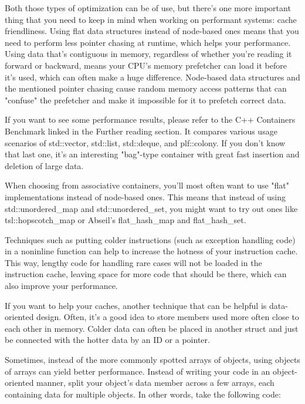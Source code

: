 
Both those types of optimization can be of use, but there's one more important thing that you need to keep in mind when working on performant systems: cache friendliness. Using flat data structures instead of node-based ones means that you need to perform less pointer chasing at runtime, which helps your performance. Using data that's contiguous in memory, regardless of whether you're reading it forward or backward, means your CPU's memory prefetcher can load it before it's used, which can often make a huge difference. Node-based data structures and the mentioned pointer chasing cause random memory access patterns that can "confuse" the prefetcher and make it impossible for it to prefetch correct data.

If you want to see some performance results, please refer to the C++ Containers Benchmark linked in the Further reading section. It compares various usage scenarios of std::vector, std::list, std::deque, and plf::colony. If you don't know that last one, it's an interesting "bag"-type container with great fast insertion and deletion of large data.

When choosing from associative containers, you'll most often want to use "flat" implementations instead of node-based ones. This means that instead of using std::unordered\_map and std::unordered\_set, you might want to try out ones like tsl::hopscotch\_map or Abseil's flat\_hash\_map and flat\_hash\_set.

Techniques such as putting colder instructions (such as exception handling code) in a noninline function can help to increase the hotness of your instruction cache. This way, lengthy code for handling rare cases will not be loaded in the instruction cache, leaving space for more code that should be there, which can also improve your performance.



If you want to help your caches, another technique that can be helpful is data-oriented design. Often, it's a good idea to store members used more often close to each other in memory. Colder data can often be placed in another struct and just be connected with the hotter data by an ID or a pointer.

Sometimes, instead of the more commonly spotted arrays of objects, using objects of arrays can yield better performance. Instead of writing your code in an object-oriented manner, split your object's data member across a few arrays, each containing data for multiple objects. In other words, take the following code:

